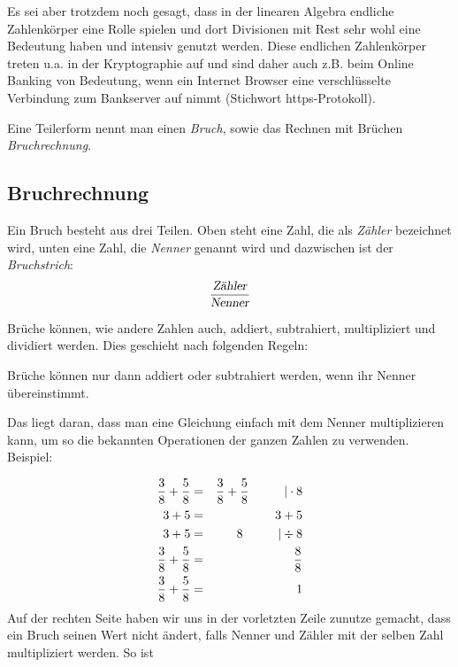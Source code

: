 Es sei aber trotzdem noch gesagt, dass in der linearen Algebra endliche Zahlenkörper eine Rolle spielen und dort Divisionen mit Rest sehr wohl eine Bedeutung haben und intensiv genutzt werden. Diese endlichen Zahlenkörper treten u.a. in der Kryptographie auf und sind daher auch z.B. beim Online Banking von Bedeutung, wenn ein Internet Browser eine verschlüsselte Verbindung zum Bankserver auf nimmt (Stichwort https-Protokoll).

\begin{definition}
Eine Teilerform nennt man einen \emph{Bruch}, sowie das Rechnen mit Brüchen \emph{Bruchrechnung}.
\end{definition}

\subsection{Bruchrechnung}

\begin{definition}
Ein Bruch besteht aus drei Teilen. Oben steht eine Zahl, die als \emph{Zähler} bezeichnet wird, unten eine Zahl, die \emph{Nenner} genannt wird und dazwischen ist der \emph{Bruchstrich}:
\[ \frac{\textsl{Zähler}}{\textsl{Nenner}} \]
\end{definition}

Brüche können, wie andere Zahlen auch, addiert, subtrahiert, multipliziert und dividiert werden. Dies geschieht nach folgenden Regeln:

\begin{definition}
Brüche können nur dann addiert oder subtrahiert werden, wenn ihr Nenner übereinstimmt. 
\end{definition}

Das liegt daran, dass man eine Gleichung einfach mit dem Nenner multiplizieren kann, um so die bekannten Operationen der ganzen Zahlen zu verwenden. Beispiel:

\begin{eqnarray*}
\frac{3}{8}+\frac{5}{8} &=& \frac{3}{8}+\frac{5}{8} \hskip 1cm | \cdot 8 \\
3 +5 &=& 3+5 \\
3+5 &=& 8 \hskip 1cm | \div 8\\
\frac{3}{8}+\frac{5}{8} &=& \frac{8}{8} \\
\frac{3}{8}+\frac{5}{8} &=& 1
\end{eqnarray*}
Auf der rechten Seite haben wir uns in der vorletzten Zeile zunutze gemacht, dass ein Bruch seinen Wert nicht ändert, falls Nenner und Zähler mit der selben Zahl multipliziert werden. So ist 

